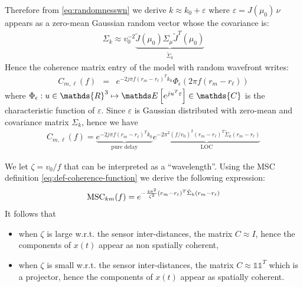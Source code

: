 Therefore from \eqref{eq:randomnesswn} we derive $k\approx k_{0}+\varepsilon$ where $\varepsilon=J(\mu_{0})\,\nu$ appears as a zero-mean Gaussian random vector whose the covariance is:
\begin{eqnarray}
 \label{eq:aec2theta}
\Sigma_{k} \approx v_{0}^{-2} 
\underbrace{\tilde J(\mu_{0}) \Sigma_{\mu} \tilde J^{T}(\mu_{0})}_{\tilde \Sigma_{k}}
\end{eqnarray}
Hence the coherence matrix entry of the model with random wavefront writes:
\begin{eqnarray*}
   C_{m,\ell}(f)&=&e^{-2j\pi f(r_{m}-r_{\ell})^{T}k_{0}}
   \Phi_{\epsilon}(2\pi f(r_{m}-r_{\ell}))
\end{eqnarray*}
where $\Phi_{\epsilon}:u\in\mathds{R}^{3}\mapsto\esp{e^{ju^{T}\varepsilon}}\in\mathds{C}$ is the characteristic function of $\varepsilon$. 
Since $\varepsilon$ is Gaussian distributed with zero-mean and covariance matrix $\Sigma_{k}$, hence we have
\begin{eqnarray}
\label{eq:Cfr1r2Gaussian}
C_{m,\ell}(f)=
\underbrace{e^{-2j\pi f(r_{m}-r_{\ell})^{T}k_{0}}}_{\text{pure delay}}
 \underbrace{e^{-2\pi^{2}(f/v_0)^{2}(r_{m}-r_{\ell})^{T}
                 \tilde \Sigma_{k}(r_{m}-r_{\ell})}}_{\text{LOC}}
 \end{eqnarray}

We let  $\zeta=v_0/f$ that can be interpreted as a ``wavelength''. Using the MSC definition \eqref{eq:def-coherence-function}  we derive the following expression:
\begin{eqnarray}
\label{eq:MSCwind}
\mathrm{MSC}_{km}(f)=
e^{-\frac{4\pi^{2}}{\zeta^{2}}(r_{m}-r_{\ell})^{T}
                 \tilde \Sigma_{k}(r_{m}-r_{\ell})}
 \end{eqnarray}
It follows that
\begin{itemize}
\item
 when $\zeta$ is large w.r.t. the sensor  inter-distances, the matrix $C\approx I$, hence the components of $x(t)$ appear as non spatially coherent,


\item
when $\zeta$ is small w.r.t.  the sensor  inter-distances, the matrix $C\approx \mathds{1} \mathds{1}^{T}$ which is a projector, hence the components of $x(t)$ appear as spatially coherent.
 

\end{itemize}
